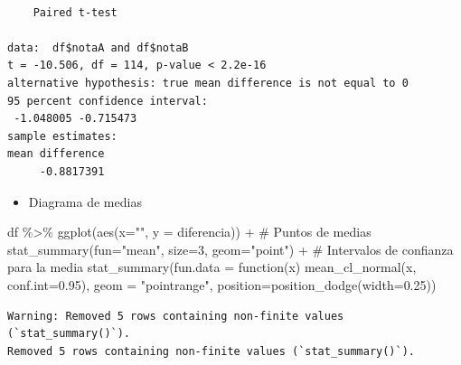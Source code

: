 \documentclass[
  a4paper,
]{scrreport}
\newenvironment{Shaded}{\begin{snugshade}}{\end{snugshade}}
\newcommand{\AttributeTok}[1]{\textcolor[rgb]{0.40,0.45,0.13}{#1}}
\newcommand{\CommentTok}[1]{\textcolor[rgb]{0.37,0.37,0.37}{#1}}
\newcommand{\ConstantTok}[1]{\textcolor[rgb]{0.56,0.35,0.01}{#1}}
\newcommand{\ControlFlowTok}[1]{\textcolor[rgb]{0.00,0.23,0.31}{#1}}
\newcommand{\DecValTok}[1]{\textcolor[rgb]{0.68,0.00,0.00}{#1}}
\newcommand{\FloatTok}[1]{\textcolor[rgb]{0.68,0.00,0.00}{#1}}
\newcommand{\FunctionTok}[1]{\textcolor[rgb]{0.28,0.35,0.67}{#1}}
\newcommand{\NormalTok}[1]{\textcolor[rgb]{0.00,0.23,0.31}{#1}}
\newcommand{\SpecialCharTok}[1]{\textcolor[rgb]{0.37,0.37,0.37}{#1}}
\newcommand{\StringTok}[1]{\textcolor[rgb]{0.13,0.47,0.30}{#1}}
\providecommand{\tightlist}{%
  \setlength{\itemsep}{0pt}\setlength{\parskip}{0pt}}\usepackage{longtable,booktabs,array}
\theoremstyle{definition}
\theoremstyle{definition}
\theoremstyle{remark}
\begin{document}
\begin{Shaded}
\end{Shaded}

\begin{verbatim}

    Paired t-test

data:  df$notaA and df$notaB
t = -10.506, df = 114, p-value < 2.2e-16
alternative hypothesis: true mean difference is not equal to 0
95 percent confidence interval:
 -1.048005 -0.715473
sample estimates:
mean difference 
     -0.8817391 
\end{verbatim}

\begin{itemize}
\tightlist
\item
  Diagrama de medias
\end{itemize}

\begin{Shaded}
\begin{Highlighting}[]
\NormalTok{df }\SpecialCharTok{\%\textgreater{}\%} \FunctionTok{ggplot}\NormalTok{(}\FunctionTok{aes}\NormalTok{(}\AttributeTok{x=}\StringTok{""}\NormalTok{, }\AttributeTok{y =}\NormalTok{ diferencia)) }\SpecialCharTok{+} 
  \CommentTok{\# Puntos de medias}
  \FunctionTok{stat\_summary}\NormalTok{(}\AttributeTok{fun=}\StringTok{"mean"}\NormalTok{, }\AttributeTok{size=}\DecValTok{3}\NormalTok{,  }\AttributeTok{geom=}\StringTok{"point"}\NormalTok{) }\SpecialCharTok{+} 
  \CommentTok{\# Intervalos de confianza para la media}
  \FunctionTok{stat\_summary}\NormalTok{(}\AttributeTok{fun.data =} \ControlFlowTok{function}\NormalTok{(x) }\FunctionTok{mean\_cl\_normal}\NormalTok{(x, }\AttributeTok{conf.int=}\FloatTok{0.95}\NormalTok{), }\AttributeTok{geom =} \StringTok{"pointrange"}\NormalTok{, }\AttributeTok{position=}\FunctionTok{position\_dodge}\NormalTok{(}\AttributeTok{width=}\FloatTok{0.25}\NormalTok{)) }
\end{Highlighting}
\end{Shaded}

\begin{verbatim}
Warning: Removed 5 rows containing non-finite values (`stat_summary()`).
Removed 5 rows containing non-finite values (`stat_summary()`).
\end{verbatim}
\end{document}
